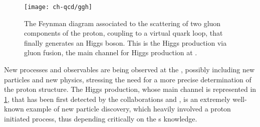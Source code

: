 \begin{figure}
	\centering
	\texttt{[image: ch-qcd/ggh]}
	\caption{
		The \lo Feynman diagram associated to the scattering of two gluon
		components of the proton, coupling to a virtual quark loop, that
		finally generates an Higgs boson.
		This is the Higgs production via gluon fusion, the main channel for
		Higgs production at \lhc.
	}
	\label{fig:qcd/ggh}
\end{figure}

New processes and observables are being observed at the \lhc, possibly
including new particles and new physics, stressing the need for a more precise
determination of the proton structure.
%
The Higgs production, whose main channel is represented in \cref{fig:qcd/ggh},
that has been first detected by the \lhc collaborations \atlas
\cite{ATLAS:2012yve} and \cms \cite{CMS:2012qbp}, is an extremely well-known
example of new particle discovery, which heavily involved a proton initiated
process, thus depending critically on the \pdf{}s knowledge.
